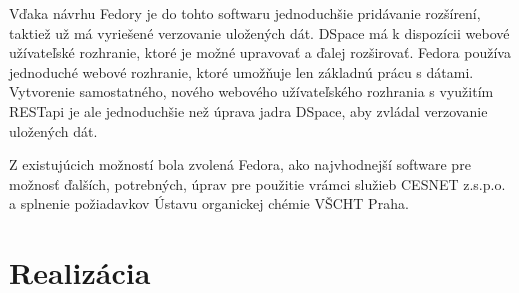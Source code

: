 \documentclass[thesis=M,slovak]{FITthesis}[2013/05/06]
\begin{document}
Vďaka návrhu Fedory je do tohto softwaru jednoduchšie pridávanie rozšírení, taktiež už má vyriešené verzovanie uložených dát. DSpace má k dispozícii webové užívateľské rozhranie, ktoré je možné upravovať a ďalej rozširovať. Fedora používa jednoduché webové rozhranie, ktoré umožňuje len základnú prácu s dátami. Vytvorenie samostatného, nového webového užívateľského rozhrania s využitím RESTapi je ale jednoduchšie než úprava jadra DSpace, aby zvládal verzovanie uložených dát.

Z existujúcich možností bola zvolená Fedora, ako najvhodnejší software pre možnosť ďalších, potrebných, úprav pre použitie vrámci služieb CESNET z.s.p.o. a splnenie požiadavkov Ústavu organickej chémie VŠCHT Praha.




%
%
%
%


\chapter{Realizácia}

\begin{conclusion}
\end{conclusion}
\end{document}
